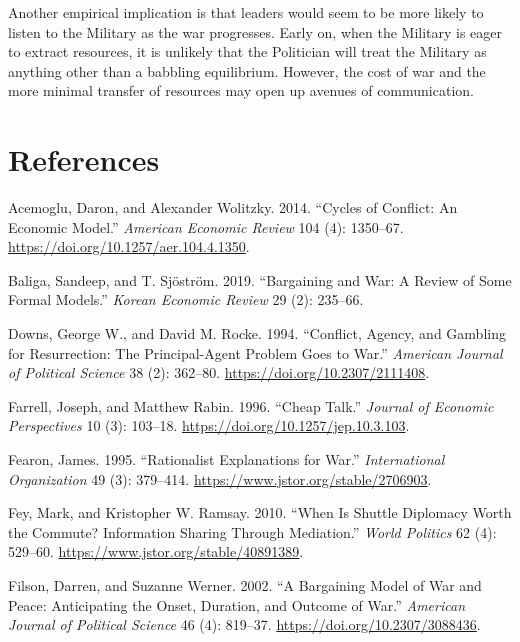 \documentclass[
  12pt,
]{article}
\newlength{\cslhangindent}
\newenvironment{CSLReferences}[2] %
 {\begin{list}{}{%
  \setlength{\itemindent}{0pt}
  \setlength{\leftmargin}{0pt}
  \setlength{\parsep}{0pt}
  \ifodd #1
   \setlength{\leftmargin}{\cslhangindent}
   \setlength{\itemindent}{-1\cslhangindent}
  \fi
  \setlength{\itemsep}{#2\baselineskip}}}
 {\end{list}}
\theoremstyle{plain}
\theoremstyle{plain}
\theoremstyle{remark}
\begin{document}
Another empirical implication is that leaders would seem to be more
likely to listen to the Military as the war progresses. Early on, when
the Military is eager to extract resources, it is unlikely that the
Politician will treat the Military as anything other than a babbling
equilibrium. However, the cost of war and the more minimal transfer of
resources may open up avenues of communication.

\newpage

\section{References}\label{references}

\label{refs}
\begin{CSLReferences}{1}{0}
Acemoglu, Daron, and Alexander Wolitzky. 2014. {``Cycles of {Conflict}:
{An Economic Model}.''} \emph{American Economic Review} 104 (4):
1350--67. \url{https://doi.org/10.1257/aer.104.4.1350}.

Baliga, Sandeep, and T. Sjöström. 2019. {``Bargaining and {War}: {A
Review} of {Some Formal Models}.''} \emph{Korean Economic Review} 29
(2): 235--66.

Downs, George W., and David M. Rocke. 1994. {``Conflict, {Agency}, and
{Gambling} for {Resurrection}: {The Principal-Agent Problem Goes} to
{War}.''} \emph{American Journal of Political Science} 38 (2): 362--80.
\url{https://doi.org/10.2307/2111408}.

Farrell, Joseph, and Matthew Rabin. 1996. {``Cheap {Talk}.''}
\emph{Journal of Economic Perspectives} 10 (3): 103--18.
\url{https://doi.org/10.1257/jep.10.3.103}.

Fearon, James. 1995. {``Rationalist {Explanations} for {War}.''}
\emph{International Organization} 49 (3): 379--414.
\url{https://www.jstor.org/stable/2706903}.

Fey, Mark, and Kristopher W. Ramsay. 2010. {``When Is Shuttle Diplomacy
Worth the Commute? {Information Sharing} Through {Mediation}.''}
\emph{World Politics} 62 (4): 529--60.
\url{https://www.jstor.org/stable/40891389}.

Filson, Darren, and Suzanne Werner. 2002. {``A {Bargaining Model} of
{War} and {Peace}: {Anticipating} the {Onset}, {Duration}, and {Outcome}
of {War}.''} \emph{American Journal of Political Science} 46 (4):
819--37. \url{https://doi.org/10.2307/3088436}.


\end{CSLReferences}
\end{document}
